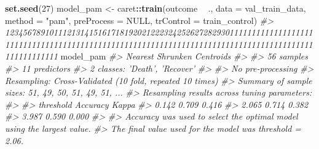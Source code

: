 \documentclass[]{book}
\newenvironment{Shaded}{\begin{snugshade}}{\end{snugshade}}
\newcommand{\CommentTok}[1]{\textcolor[rgb]{0.56,0.35,0.01}{\textit{#1}}}
\newcommand{\DataTypeTok}[1]{\textcolor[rgb]{0.13,0.29,0.53}{#1}}
\newcommand{\DecValTok}[1]{\textcolor[rgb]{0.00,0.00,0.81}{#1}}
\newcommand{\KeywordTok}[1]{\textcolor[rgb]{0.13,0.29,0.53}{\textbf{#1}}}
\newcommand{\NormalTok}[1]{#1}
\newcommand{\OperatorTok}[1]{\textcolor[rgb]{0.81,0.36,0.00}{\textbf{#1}}}
\newcommand{\OtherTok}[1]{\textcolor[rgb]{0.56,0.35,0.01}{#1}}
\newcommand{\StringTok}[1]{\textcolor[rgb]{0.31,0.60,0.02}{#1}}
\begin{document}
\begin{Shaded}
\begin{Highlighting}[]
\KeywordTok{set.seed}\NormalTok{(}\DecValTok{27}\NormalTok{)}
\NormalTok{model_pam <-}\StringTok{ }\NormalTok{caret}\OperatorTok{::}\KeywordTok{train}\NormalTok{(outcome }\OperatorTok{~}\StringTok{ }\NormalTok{.,}
                             \DataTypeTok{data =}\NormalTok{ val_train_data,}
                             \DataTypeTok{method =} \StringTok{"pam"}\NormalTok{,}
                             \DataTypeTok{preProcess =} \OtherTok{NULL}\NormalTok{,}
                             \DataTypeTok{trControl =}\NormalTok{ train_control)}
\CommentTok{#> 12345678910111213141516171819202122232425262728293011111111111111111111111111111111111111111111111111111111111111111111111111111111111111111111111111111}
\NormalTok{model_pam}
\CommentTok{#> Nearest Shrunken Centroids }
\CommentTok{#> }
\CommentTok{#> 56 samples}
\CommentTok{#> 11 predictors}
\CommentTok{#>  2 classes: 'Death', 'Recover' }
\CommentTok{#> }
\CommentTok{#> No pre-processing}
\CommentTok{#> Resampling: Cross-Validated (10 fold, repeated 10 times) }
\CommentTok{#> Summary of sample sizes: 51, 49, 50, 51, 49, 51, ... }
\CommentTok{#> Resampling results across tuning parameters:}
\CommentTok{#> }
\CommentTok{#>   threshold  Accuracy  Kappa}
\CommentTok{#>   0.142      0.709     0.416}
\CommentTok{#>   2.065      0.714     0.382}
\CommentTok{#>   3.987      0.590     0.000}
\CommentTok{#> }
\CommentTok{#> Accuracy was used to select the optimal model using the largest value.}
\CommentTok{#> The final value used for the model was threshold = 2.06.}
\end{Highlighting}
\end{Shaded}
\end{document}
